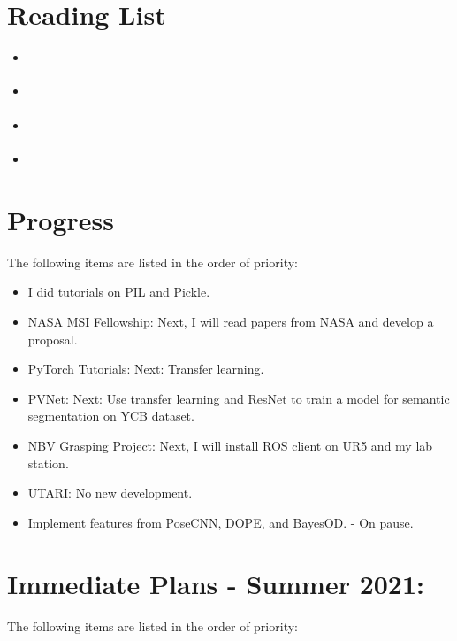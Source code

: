 \documentclass[11pt]{article}
\begin{document}
\section{Reading List}
\begin{itemize}
      \item \cite{roadmap251:online}
      \item \cite{ferraz2014leveraging}
      \item \cite{he2015deep}
      \item \cite{du2020vision}
\end{itemize}

\section{Progress}
The following items are listed in the order of priority:
\begin{itemize}
      \item I did tutorials on PIL and Pickle.
      \item NASA MSI Fellowship: Next, I will read papers from NASA
      \cite{NASATech44:online} and develop a proposal.
      \item PyTorch Tutorials: Next: Transfer learning.
      \item PVNet: Next: Use transfer learning and ResNet to train a model for
      semantic segmentation on YCB dataset.
      \item NBV Grasping Project: Next, I will install ROS client on UR5 and
      my lab station.
      \item UTARI: No new development.
      \item Implement features from PoseCNN, DOPE, and BayesOD. - On pause.
\end{itemize}


\section{Immediate Plans - Summer 2021:}
The following items are listed in the order of priority:
\end{document}
